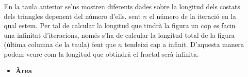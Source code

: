 \documentclass[12pt]{report}
\begin{document}
\newline
\newline
\newline
En la taula anterior se'ns mostren diferents dades sobre la longitud dels costats dels triangles depenent del número d'ells, sent $n$ el número de la iteració en la qual estem.
\newline
Per tal de calcular la longitud que tindrà la figura un cop es facin una infinitat d'iteracions, només s'ha de calcular la longitud total de la figura (última columna de la taula) fent que $n$ tendeixi cap a infinit. D'aquesta manera podem veure com la longitud que obtindrà el fractal serà infinita.
\newline
\newline
\newline
\newline
\newline
\newline
\newline
\newline
\newline
\newline
\newline
\newline
\newline
\begin{itemize}
\item \textbf{Àrea}
\end{itemize}
\end{document}

